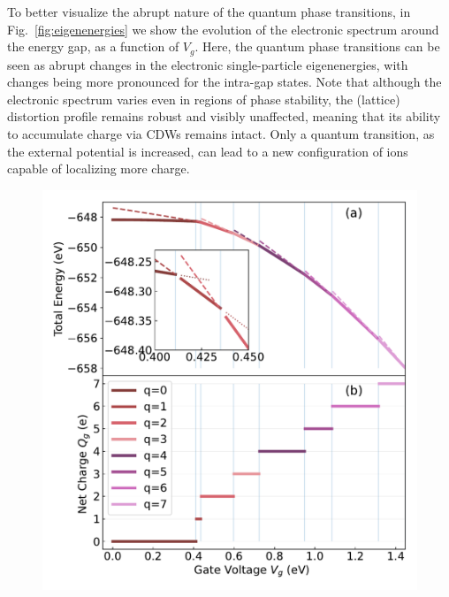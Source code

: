 \documentclass[10pt,a4paper]{article}
\begin{document}
To better visualize the abrupt nature of the quantum phase transitions, in Fig.~\ref{fig:eigenenergies} we show the evolution of the electronic spectrum around the energy gap, as a function of $V_{g}$. Here, the quantum phase transitions can be seen as abrupt changes in the electronic single-particle eigenenergies, with changes being more pronounced for the intra-gap states. Note that although the electronic spectrum varies even in regions of phase stability, the (lattice) distortion profile remains robust and visibly unaffected, meaning that its ability to accumulate charge via CDWs remains intact. Only a quantum transition, as the external potential is increased, can lead to a new configuration of ions capable of localizing more charge.
%
\begin{figure}
    \centering
    \includegraphics[scale=0.7]{figures/energy_and_charge.pdf}

\end{figure}
\end{document}
